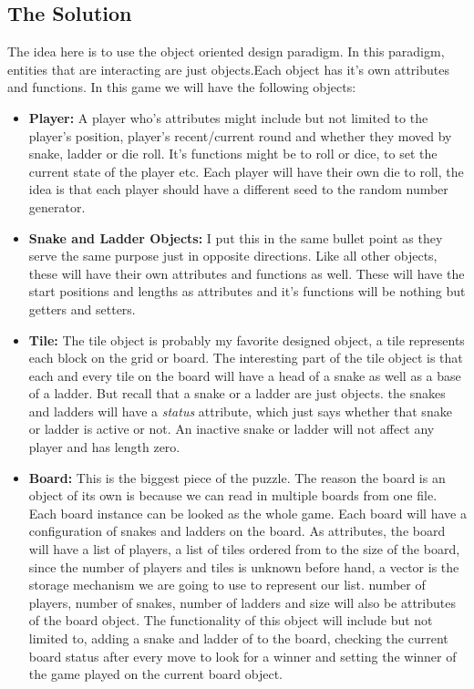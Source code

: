 \subsection*{The Solution}
The idea here is to use the object oriented design paradigm. In this paradigm, entities that are interacting are just objects.Each object has it's own attributes and functions. In this game we will have the following objects:
\begin{itemize}
	\item \textbf{Player:} A player who's attributes might include but not limited to the player's position, player's recent/current round and whether they moved by snake, ladder or die roll. It's functions might be to roll or dice, to set the current state of the player etc. Each player will have their own die to roll, the idea is that each player should have a different seed to the random number generator. 
	\item \textbf{Snake and Ladder Objects:} I put this in the same bullet point as they serve the same purpose just in opposite directions. Like all other objects, these will have their own  attributes and functions as well. These will have the start positions and lengths as attributes and it's functions will be nothing but getters and setters.
	\item \textbf{Tile:} The tile object is probably my favorite designed object, a tile represents each block on the grid or board. The interesting part of the tile object is that each and every tile on the board will have a head of a snake as well as a base of a ladder. But recall that a snake or a ladder are just objects. the snakes and ladders will have a \textit{status} attribute, which just says whether that snake or ladder is active or not. An inactive snake or ladder will not affect any player and has length zero.
	\item \textbf{Board:} This is the biggest piece of the puzzle. The reason the board is an object of its own is because we can read in multiple boards from one file. Each board instance can be looked as the whole game. Each board will have a configuration of snakes and ladders on the board. As attributes, the board will have a list of players, a list of tiles ordered from to the size of the board, since the number of players and tiles is unknown before hand, a vector is the storage mechanism we are going to use to represent our list. number of players, number of snakes, number of ladders and size will also be attributes of the board object. The functionality of this object will include but not limited to, adding a snake and ladder of to the board, checking the current board status after every move to look for a winner and setting the winner of the game played on the current board object.
\end{itemize}

